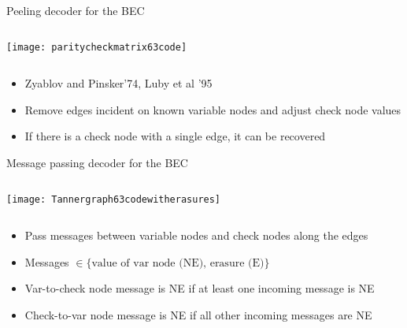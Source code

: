 \begin{frame}{Peeling decoder for the BEC}
\vspace{-5mm}
\begin{columns}
\texttt{[image: paritycheckmatrix63code]}
\scalebox{1}{}
\end{columns}
\begin{block}{}
\begin{itemize}
  \item Zyablov and Pinsker'74, Luby et al '95
  \item Remove edges incident on known variable nodes and adjust check node values
  \item If there is a check node with a \alert{single edge}, it can be recovered
\end{itemize}
\end{block}
\end{frame}
\begin{frame}{Message passing decoder for the BEC}
\vspace{-5mm}
\begin{columns}
\scalebox{1}{}
\texttt{[image: Tannergraph63codewitherasures]}
\end{columns}
\vspace{-5mm}
\begin{block}{}
\begin{itemize}
  \item Pass messages between variable nodes and check nodes along the edges
  \item Messages $\in \{\text{value of var node (NE), erasure (E)}\}$
  \item Var-to-check node message is NE if \alert{at least one incoming message is NE}
  \item Check-to-var node message is NE if \alert{all other incoming messages are NE}
\end{itemize}
\end{block}
\end{frame}

